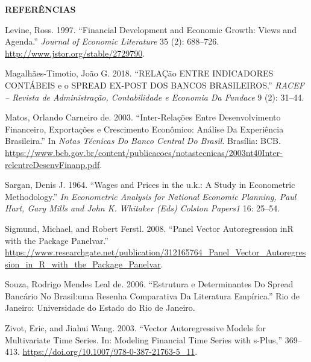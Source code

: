 \documentclass[
  ignorenonframetext,
  aspectratio=169,
  ignorenonframetext]{beamer}
\newlength{\cslhangindent}
\newenvironment{CSLReferences}[2] %
 {%
  \setlength{\parindent}{0pt}
  \ifodd #1 \everypar{\setlength{\hangindent}{\cslhangindent}}\ignorespaces\fi
  \ifnum #2 > 0
  \setlength{\parskip}{#2\baselineskip}
  \fi
 }%
 {}
\begin{document}
\begin{frame}{\textbf{REFERÊNCIAS}}
\begin{CSLReferences}{1}{0}
\leavevmode{}%
Levine, Ross. 1997. {``Financial Development and Economic Growth: Views
and Agenda.''} \emph{Journal of Economic Literature} 35 (2): 688--726.
\url{http://www.jstor.org/stable/2729790}.

\leavevmode{}%
Magalhães-Timotio, João G. 2018. {``RELAÇão ENTRE INDICADORES CONTÁBEIS
e o SPREAD EX-POST DOS BANCOS BRASILEIROS.''} \emph{RACEF -- Revista de
Administração, Contabilidade e Economia Da Fundace} 9 (2): 31--44.

\leavevmode{}%
Matos, Orlando Carneiro de. 2003. {``Inter-Relações Entre
Desenvolvimento Financeiro, Exportações e Crescimento Econômico: Análise
Da Experiência Brasileira.''} In \emph{Notas Técnicas Do Banco Central
Do Brasil}. Brasília: BCB.
\url{https://www.bcb.gov.br/content/publicacoes/notastecnicas/2003nt40Inter-relentreDesenvFinanp.pdf}.

\leavevmode{}%
Sargan, Denis J. 1964. {``Wages and Prices in the u.k.: A Study in
Econometric Methodology.''} \emph{In Econometric Analysis for National
Economic Planning, Paul Hart, Gary Mills and John K. Whitaker (Eds)
Colston Papers1} 16: 25--54.

\leavevmode{}%
Sigmund, Michael, and Robert Ferstl. 2008. {``Panel Vector
Autoregression inR with the Package Panelvar.''}
\url{https://www.researchgate.net/publication/312165764_Panel_Vector_Autoregression_in_R_with_the_Package_Panelvar}.

\leavevmode{}%
Souza, Rodrigo Mendes Leal de. 2006. {``Estrutura e Determinantes Do
Spread Bancário No Brasil:uma Resenha Comparativa Da Literatura
Empírica.''} Rio de Janeiro: Universidade do Estado do Rio de Janeiro.

\leavevmode{}%
Zivot, Eric, and Jiahui Wang. 2003. {``Vector Autoregressive Models for
Multivariate Time Series. In: Modeling Financial Time Series with
s-Plus,''} 369--413. \url{https://doi.org/10.1007/978-0-387-21763-5_11}.

\end{CSLReferences}
\end{frame}
\end{document}
